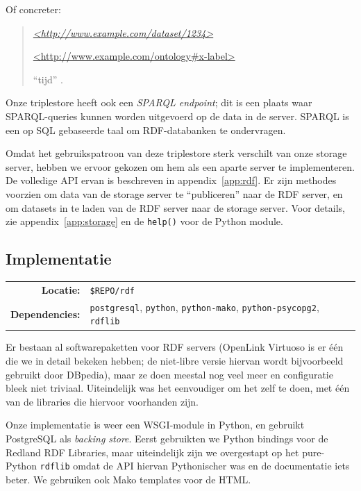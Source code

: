 \documentclass[a4paper]{article}
\begin{document}
Of concreter:

\begin{quotation}
    {\it \url{<http://www.example.com/dataset/1234>}

         \url{<http://www.example.com/ontology#x-label>}

         ``tijd'' .}
\end{quotation}

Onze triplestore heeft ook een {\it \gls{SPARQL} endpoint}; dit is een plaats
waar \gls{SPARQL}-queries kunnen worden uitgevoerd op de data in de server.
\gls{SPARQL} is een op \gls{SQL} gebaseerde taal om \gls{RDF}-databanken te
ondervragen.

Omdat het gebruikspatroon van deze triplestore sterk verschilt van onze storage
server, hebben we ervoor gekozen om hem als een aparte server te implementeren.
De volledige \gls{API} ervan is beschreven in appendix~\ref{app:rdf}. Er zijn
methodes voorzien om data van de storage server te ``publiceren'' naar de
\gls{RDF} server, en om datasets in te laden van de \gls{RDF} server naar de
storage server. Voor details, zie appendix~\ref{app:storage} en de {\tt help()}
voor de Python module.

\subsection{Implementatie}

\begin{tabular}{rl}
    {\bf Locatie:}      & {\tt \$REPO/rdf}      \\
    {\bf Dependencies:} & {\tt postgresql}, {\tt python}, {\tt python-mako},
                          {\tt python-psycopg2}, {\tt rdflib}
\end{tabular}

\vspace{.05in}

Er bestaan al softwarepaketten voor \gls{RDF} servers (OpenLink Virtuoso is er
\'e\'en die we in detail bekeken hebben; de niet-libre versie hiervan wordt
bijvoorbeeld gebruikt door DBpedia), maar ze doen meestal nog veel meer en
configuratie bleek niet triviaal. Uiteindelijk was het eenvoudiger om het zelf
te doen, met \'e\'en van de libraries die hiervoor voorhanden zijn.

Onze implementatie is weer een \gls{WSGI}-module in Python, en gebruikt
Postgre\gls{SQL} als {\it backing store}. Eerst gebruikten we Python bindings
voor de Redland \gls{RDF} Libraries, maar uiteindelijk zijn we overgestapt op
het pure-Python {\tt rdflib} omdat de \gls{API} hiervan Pythonischer was en de
documentatie iets beter. We gebruiken ook Mako templates voor de \gls{HTML}.
\end{document}
